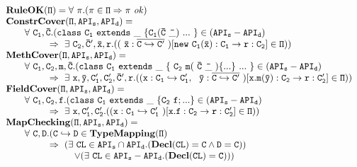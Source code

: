 \documentclass[letterpaper]{article}
\newcommand{\indentspace}{~~~~~~~~}
\begin{document}
\[
\begin{array}{ll}
\tt \mathbf{RuleOK} \tt(\Pi) = \forall~\pi. (\pi\in\Pi \Rightarrow \pi~\mathit{ok})\\
\tt \mathbf{ConstrCover} \tt(\Pi, API_s, API_d) =\\
\qquad                  \tt \forall~C_1,\bar{C}. (class\ C_1\ extends\ \_~\{ C_1(\bar{C}\ \bar{\_})~...~\}\in (API_s-API_d) \\
\qquad                  \tt \indentspace\Rightarrow~ \exists~C_2,\bar{C}',\bar{x},r.((~\bar{x}:\overline{C\hookrightarrow C'}~)[new\ C_1(\bar{x}):C_1\rightarrow r:C_2]\in\Pi))\\
\tt \mathbf{MethCover}\tt(\Pi, API_s, API_d) =\\ 
\qquad                  \tt \forall~C_1,C_2,m,\bar{C}.(class\ C_1\ extends\ \_~\{~C_2\ m(~\bar{C}\ \bar{\_}~)\{...\}~...~\}\in (API_s-API_d) \\
\qquad                  \tt \indentspace\Rightarrow~ \exists~x,\bar{y},C'_1,C'_2,\bar{C}',r.((x:C_1\hookrightarrow C'_1,\ ~\bar{y}:\overline{C\hookrightarrow C'}~)[x.m(\bar{y}):C_2\rightarrow r:C'_2] \in \Pi))\\
\tt \mathbf{FieldCover}\tt(\Pi, API_s, API_d) =\\ 
\qquad                  \tt \forall~C_1,C_2,f.(class\ C_1\ extends\ \_~\{C_2\ f;...\}\in (API_s-API_d) \\
\qquad                  \tt \indentspace \Rightarrow~ \exists~x,C'_1,C'_2.((x:C_1\hookrightarrow C'_1~)[x.f:C_2\rightarrow r:C'_2] \in \Pi))                           \\
\tt \mathbf{MapChecking}\tt(\Pi, API_s, API_d) =\\
\qquad                  \tt \forall~C,D.(C\hookrightarrow D\in \mathbf{TypeMapping}(\Pi)\\
\qquad                  \tt \indentspace\Rightarrow~ (\exists~CL\in API_s \cap API_d. (\mathbf{Decl}(CL)=C \land D = C))\\
\qquad                  \tt \indentspace\indentspace \lor (\exists~CL\in API_s-API_d. (\mathbf{Decl}(CL)=C)))\\

\end{array}\]
\end{document}
